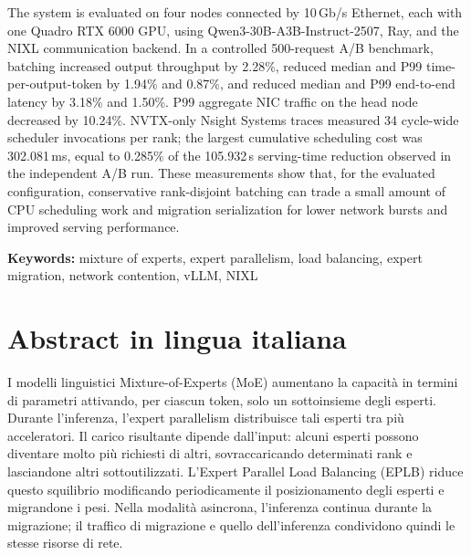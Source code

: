 \documentclass{Configuration_Files/PoliMi3i_thesis}
\newcommand{\SI}[2]{#1\,#2}
\begin{document}
The system is evaluated on four nodes connected by \SI{10}{Gb/s} Ethernet,
each with one Quadro RTX 6000 GPU, using Qwen3-30B-A3B-Instruct-2507, Ray,
and the NIXL communication backend. In a controlled 500-request A/B benchmark,
batching increased output throughput by 2.28\%, reduced median and P99
time-per-output-token by 1.94\% and 0.87\%, and reduced median and P99
end-to-end latency by 3.18\% and 1.50\%. P99 aggregate NIC traffic on the head
node decreased by 10.24\%. NVTX-only Nsight Systems traces measured 34
cycle-wide scheduler invocations per rank; the largest cumulative scheduling
cost was \SI{302.081}{ms}, equal to 0.285\% of the \SI{105.932}{s} serving-time
reduction observed in the independent A/B run. These measurements show that,
for the evaluated configuration, conservative rank-disjoint batching can trade
a small amount of CPU scheduling work and migration serialization for lower
network bursts and improved serving performance.

\textbf{Keywords:} mixture of experts, expert parallelism, load balancing,
expert migration, network contention, vLLM, NIXL

\chapter*{Abstract in lingua italiana}
I modelli linguistici Mixture-of-Experts (MoE) aumentano la capacità in termini
di parametri attivando, per ciascun token, solo un sottoinsieme degli esperti.
Durante l'inferenza, l'expert parallelism distribuisce tali esperti tra più
acceleratori. Il carico risultante dipende dall'input: alcuni esperti possono
diventare molto più richiesti di altri, sovraccaricando determinati rank e
lasciandone altri sottoutilizzati. L'Expert Parallel Load Balancing (EPLB)
riduce questo squilibrio modificando periodicamente il posizionamento degli
esperti e migrandone i pesi. Nella modalità asincrona, l'inferenza continua
durante la migrazione; il traffico di migrazione e quello dell'inferenza
condividono quindi le stesse risorse di rete.
\end{document}
